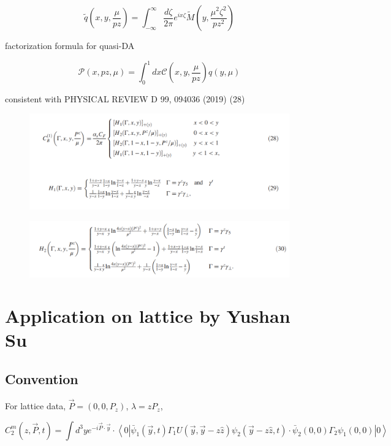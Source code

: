 \documentclass{article}
\begin{document}
  \begin{equation}
  	\tilde {q}(x,y,\frac{\mu}{pz})= \int_{-\infty}^{\infty} \frac{d\zeta}{2\pi}e^{ix\zeta}\tilde{M}(y,\frac{\mu^2\zeta^2}{pz^2})
  \end{equation}  

   factorization formula for quasi-DA

   \begin{equation}
	\mathcal{P}(x,pz,\mu)= \int_{0}^{1} dx	\mathcal{C}(x,y,\frac{\mu}{pz}) q(y,\mu)
  \end{equation}

   consistent with PHYSICAL REVIEW D 99, 094036 (2019) (28) 
   
   
    \begin{figure}
   	\centering
   	\includegraphics[scale=0.7]{fig6.png} 	
   \end{figure} 
   
     \begin{figure}
 	\centering
 	\includegraphics[scale=0.7]{fig7.png} 	
    \end{figure}  



\section{Application on lattice by Yushan Su}

\subsection{Convention}
For lattice data, $\vec{P} = (0, 0, P_z)$, $\lambda = z P_z$,

\begin{equation}
    C_2^m(z, \vec{P}, t) = \int d^3 y e^{-i \vec{P} \cdot \vec{y}} \cdot \left\langle 0\left|\bar{\psi}_{1}(\vec{y}, t) \Gamma_{1} U(\vec{y}, \vec{y}-z \hat{z}) \psi_{2}(\vec{y}-z \hat{z}, t) \cdot \bar{\psi}_{2}(0,0) \Gamma_{2} \psi_{1}(0,0)\right| 0\right\rangle
\end{equation}
\end{document}
